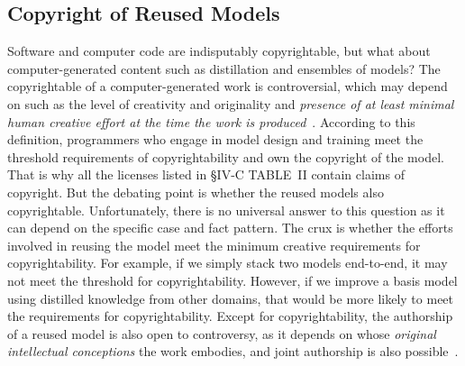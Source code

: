 \documentclass[journal]{IEEEtran}
\begin{document}
\subsection{Copyright of Reused Models}
\label{sec:generated content}
Software and computer code are indisputably copyrightable, but what about computer-generated content such as distillation and ensembles of models?
The copyrightable of a computer-generated work is controversial, which may depend on such as the level of creativity and originality and \textit{presence of at least minimal human creative effort at the time the work is produced}~\cite{national1979final}.
According to this definition, programmers who engage in model design and training meet the threshold requirements of copyrightability and own the copyright of the model. 
That is why all the licenses listed in \S{IV-C} TABLE~II contain claims of copyright.
But the debating point is whether the reused models also copyrightable.
Unfortunately, there is no universal answer to this question as it can depend on the specific case and fact pattern.
The crux is whether the efforts involved in reusing the model meet the minimum creative requirements for copyrightability.
For example, if we simply stack two models end-to-end, it may not meet the threshold for copyrightability. 
However, if we improve a basis model using distilled knowledge from other domains, that would be more likely to meet the requirements for copyrightability.
Except for copyrightability, the authorship of a reused model is also open to controversy, as it depends on whose \textit{original intellectual conceptions} the work embodies, and joint authorship is also possible~\cite{hedrick2019ithink}.
\end{document}

